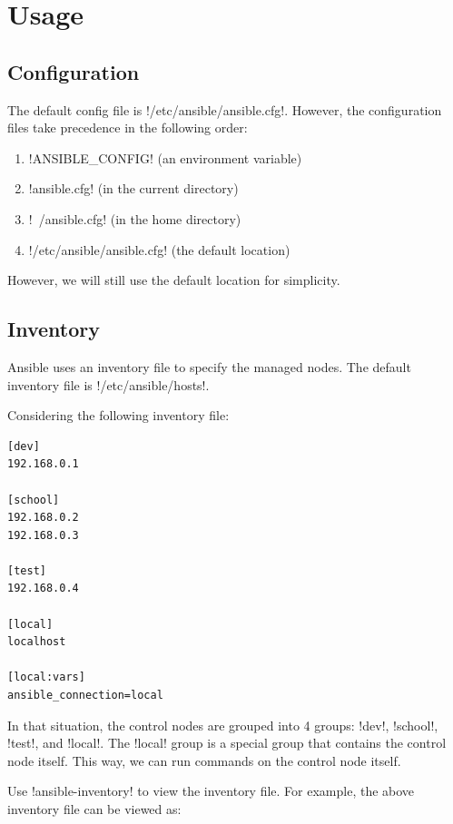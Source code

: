 \documentclass{article}
\begin{document}
\section{Usage}

\subsection{Configuration}

The default config file is \mono!/etc/ansible/ansible.cfg!. However, the
configuration files take precedence in the following order:

\begin{enumerate}
    \item \mono!ANSIBLE_CONFIG! (an environment variable)
    \item \mono!ansible.cfg! (in the current directory)
    \item \mono!~/ansible.cfg! (in the home directory)
    \item \mono!/etc/ansible/ansible.cfg! (the default location)
\end{enumerate}

However, we will still use the default location for simplicity.

\subsection{Inventory}

Ansible uses an inventory file to specify the managed nodes. The default
inventory file is \mono!/etc/ansible/hosts!.

Considering the following inventory file:

\begin{verbatim}
[dev]
192.168.0.1

[school]
192.168.0.2
192.168.0.3

[test]
192.168.0.4

[local]
localhost

[local:vars]
ansible_connection=local
\end{verbatim}

In that situation, the control nodes are grouped into 4 groups: \mono!dev!,
\mono!school!, \mono!test!, and \mono!local!. The \mono!local! group is a
special group that contains the control node itself. This way, we can run
commands on the control node itself.

Use \mono!ansible-inventory! to view the inventory file. For example, the above
inventory file can be viewed as:
\end{document}
